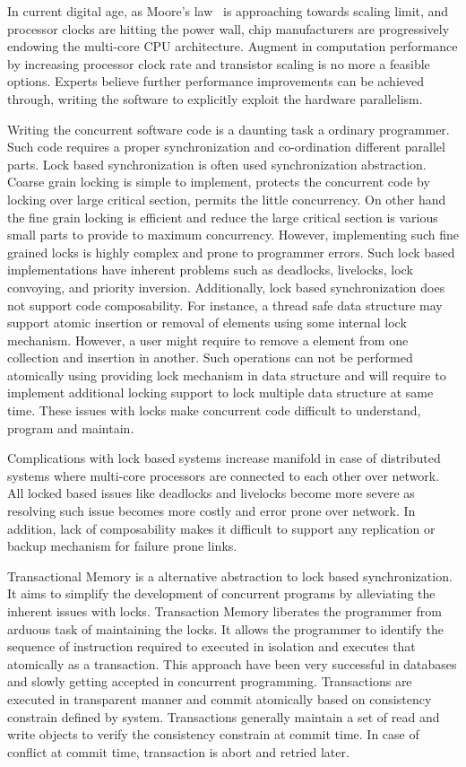 \documentclass[12pt,english]{report}
\begin{document}
In current digital age, as Moore's law~\cite{schaller1997moore} is approaching towards scaling limit, and processor clocks are hitting the power wall, chip manufacturers are progressively endowing the multi-core CPU architecture. Augment in computation performance by increasing processor clock rate and transistor scaling is no more a feasible options. Experts believe further performance improvements can be achieved through, writing the software to explicitly exploit the hardware parallelism. 

Writing the concurrent software code is a daunting task a ordinary programmer. Such code requires a proper synchronization and co-ordination different parallel parts. Lock based synchronization is often used synchronization abstraction. Coarse grain locking is simple to implement, protects the concurrent code by locking over large critical section, permits the little concurrency. On other hand the fine grain locking is efficient and reduce the large critical section is various small parts to provide to maximum concurrency. However, implementing such fine grained locks is highly complex and prone to programmer errors. Such lock based implementations have inherent problems such as deadlocks, livelocks, lock convoying, and priority inversion. Additionally, lock based synchronization does not support code composability. For instance, a thread safe data structure may support atomic insertion or removal of elements using some internal lock mechanism. However, a user might require to remove a element from one collection and insertion in another. Such operations can not be performed atomically using providing lock mechanism in data structure and will require to implement additional locking support to lock multiple data structure at same time. These issues with locks make concurrent code difficult to understand, program and maintain.

Complications with lock based systems increase manifold in case of distributed systems where multi-core processors are connected to each other over network. All locked based issues like deadlocks and livelocks become more severe as resolving such issue becomes more costly and error prone over network. In addition, lack of composability makes it difficult to support any replication or backup mechanism for failure  prone links.    

Transactional Memory is a alternative abstraction to lock based synchronization. It aims to simplify the development of concurrent programs by alleviating the inherent issues with locks. Transaction Memory liberates the programmer from arduous task of maintaining the locks. It allows the programmer to identify the  sequence of instruction required to executed in isolation and executes that atomically as a transaction. This approach have been very successful in databases and slowly getting accepted in concurrent programming. Transactions are executed in transparent manner and commit atomically based on consistency constrain defined by system. Transactions generally maintain a set of read and write objects to verify the consistency constrain at commit time. In case of conflict at commit time, transaction is abort and retried later.      
\end{document}

